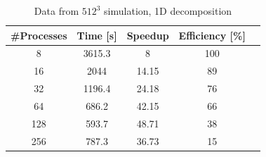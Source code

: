 \begin{table}
\caption{Data from $512^{3}$ simulation, 1D decomposition}
\begin{center}
\begin{tabular}{c c c c c}
\toprule
\textbf{\#Processes} & \textbf{Time [s]} & \textbf{Speedup} & \textbf{Efficiency [\%]}\\
\midrule
8 & 3615.3 & 8 & 100\\
16 & 2044 & 14.15 & 89\\
32 & 1196.4 & 24.18 & 76\\
64 & 686.2 & 42.15 & 66\\
128 & 593.7 & 48.71 & 38 \\
256 & 787.3 & 36.73 & 15\\
\bottomrule
\end{tabular}
\end{center}
\label{512data}
\end{table}

